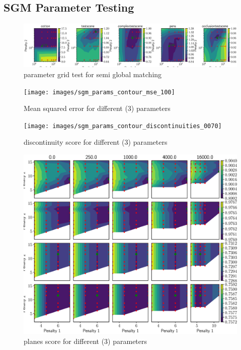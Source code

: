 \documentclass  [
  paper    = a4,
  BCOR     = 10mm,
  twoside,
  fontsize = 12pt,
  fleqn,
  toc      = bibnumbered,
  toc      = listofnumbered,
  numbers  = noendperiod,
  headings = normal,
  listof   = leveldown,
  version  = 3.03
]                                       {scrreprt}
\begin{document}
\begin{appendix}
  	
  	 
  	\chapter{SGM Parameter Testing}
  	\begin{figure}
  		\centering
  		\includegraphics[width=1\linewidth]{images/sgm_param_contour}
  		\caption[parameter grid test for semi global matching]{parameter grid test for semi global matching}
  		\label{fig:sgmparamcontour}
  	\end{figure}
  	
  	\begin{figure}
  		\centering
  		\texttt{[image: images/sgm\_params\_contour\_mse\_100]}
  		\caption[Mean squared error for different (3) parameters]{Mean squared error for different (3) parameters}
  		\label{fig:sgmparamscontourmse100}
  	\end{figure}
  	
  	\begin{figure}
  		\centering
  		\texttt{[image: images/sgm\_params\_contour\_discontinuities\_0070]}
  		\caption[Discontinuity score for different (3) parameters]{discontinuity score for different (3) parameters}
  		\label{fig:sgmparamscontourdis}
  	\end{figure}
  	
  	\begin{figure}
  		\centering
  		\includegraphics[width=1\linewidth]{images/sgm_params_contour_mae_planes}
  		\caption[planes score for different (3) parameters]{planes score for different (3) parameters}
  		\label{fig:sgmparamscontourdmae}
  	\end{figure}
  

\end{appendix}
\end{document}
